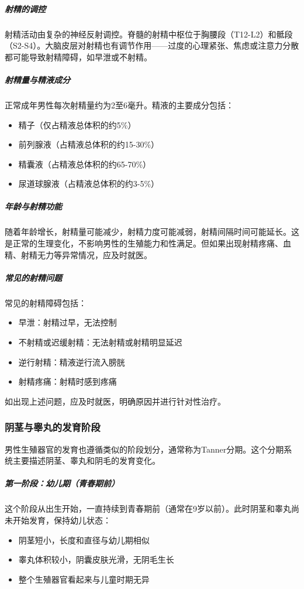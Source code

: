 \subparagraph{射精的调控}

射精活动由复杂的神经反射调控。脊髓的射精中枢位于胸腰段（T12-L2）和骶段（S2-S4）。大脑皮层对射精也有调节作用——过度的心理紧张、焦虑或注意力分散都可能导致射精障碍，如早泄或不射精。

\subparagraph{射精量与精液成分}

正常成年男性每次射精量约为2至6毫升。精液的主要成分包括：
\begin{itemize}
    \item 精子（仅占精液总体积的约5\%）
    \item 前列腺液（占精液总体积的约15-30\%）
    \item 精囊液（占精液总体积的约65-70\%）
    \item 尿道球腺液（占精液总体积的约3-5\%）
\end{itemize}

\subparagraph{年龄与射精功能}

随着年龄增长，射精量可能减少，射精力度可能减弱，射精间隔时间可能延长。这是正常的生理变化，不影响男性的生殖能力和性满足。但如果出现射精疼痛、血精、射精无力等异常情况，应及时就医。

\subparagraph{常见的射精问题}

常见的射精障碍包括：
\begin{itemize}
    \item 早泄：射精过早，无法控制
    \item 不射精或迟缓射精：无法射精或射精明显延迟
    \item 逆行射精：精液逆行流入膀胱
    \item 射精疼痛：射精时感到疼痛
\end{itemize}
如出现上述问题，应及时就医，明确原因并进行针对性治疗。

\subsubsection{阴茎与睾丸的发育阶段}

男性生殖器官的发育也遵循类似的阶段划分，通常称为Tanner分期。这个分期系统主要描述阴茎、睾丸和阴毛的发育变化。

\subparagraph{第一阶段：幼儿期（青春期前）}

这个阶段从出生开始，一直持续到青春期前（通常在9岁以前）。此时阴茎和睾丸尚未开始发育，保持幼儿状态：
\begin{itemize}
    \item 阴茎短小，长度和直径与幼儿期相似
    \item 睾丸体积较小，阴囊皮肤光滑，无阴毛生长
    \item 整个生殖器官看起来与儿童时期无异
\end{itemize}

